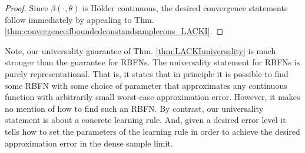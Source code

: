 \begin{proof}
Since $\beta(\cdot,\theta)$ is H\"older continuous, the desired convergence statements follow immediately by appealing to Thm. \ref{thm:convergenceifboundedconstandsamplecons_LACKI}.
%
%
%
%
%
%

\end{proof}

\begin{remark}
Note, our universality guarantee of Thm. \ref{thm:LACKIuniversality} is much stronger than the guarantee for RBFNs.
 The universality statement for RBFNs is purely representational. That is, it states that in principle it is possible to find some RBFN with some choice of parameter that approximates any continuous function with arbitrarily small worst-case approximation error. However, it makes no mention of how to find such an RBFN. By contrast, our universality statement is about a concrete learning rule. And, given a desired error level it tells how to set the parameters of the learning rule in order to achieve the desired approximation error in the dense sample limit.
\end{remark}

